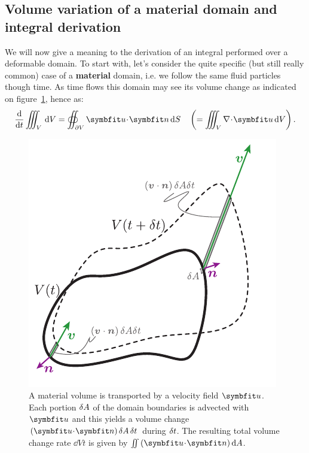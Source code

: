 \subsection{Volume variation of a material domain and integral derivation}
We will now give a meaning to the derivation of an integral performed over a deformable domain. To start with, let's consider the quite specific (but still really common) case of a \textbf{material} domain, i.e. we follow the same fluid particles though time. As time flows this domain may see its volume change as indicated on figure~\ref{fig:volume_change}, hence as:
\begin{equation}
\dd{}{t}\iiint_{V}\, \dV = \oiint_{\partial V} \bu\!\cdot\!\bn\,\dS \quad \lp = \iiint_V \nabla \!\cdot\! \bu \, \dV\rp.
\end{equation}
\begin{figure}[htbp]
\begin{center}
\includegraphics{./pics/volume_change.pdf}
\caption{A material volume is transported by a velocity field $\bu$. Each portion $\delta A$ of the domain boundaries is advected with $\bu$ and this yields a volume change $\lp\bu\!\cdot\!\bn\rp\delA \,\delt$ during $\delta t$. The resulting total volume change rate $\dd{V}{t}$ is given by $\iint \lp\bu\!\cdot\!\bn\rp \dA$.}
\label{fig:volume_change}
\end{center}
\end{figure}


